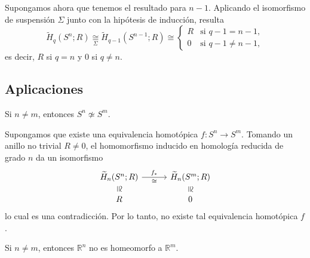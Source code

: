 \begin{dem}
Supongamos ahora que tenemos el resultado para $n - 1$. Aplicando el isomorfismo de suspensión $\Sigma$ junto con la hipótesis de inducción, resulta
\[
\widetilde{H}_q(S^n; R) \underset{\Sigma}{\cong} \widetilde{H}_{q-1}(S^{n-1}; R) \cong
\begin{cases}
R & \text{si } q - 1 = n - 1, \\
0 & \text{si } q - 1 \neq n - 1,
\end{cases}
\]
es decir, $R$ si $q = n$ y $0$ si $q \neq n$.
\end{dem}

\subsection{Aplicaciones}
\begin{corolario}
Si $n \neq m$, entonces $S^n \not\simeq S^m$.
\end{corolario}

\begin{dem}
Supongamos que existe una equivalencia homotópica $f \colon S^n \to S^m$. Tomando un anillo no trivial $R \neq 0$, el homomorfismo inducido en homología reducida de grado $n$ da un isomorfismo
\[
\begin{tikzcd}[column sep=3.0em, row sep=1.0em]
\widetilde{H}_n(S^n; R)
    \arrow[r, "f_*", "\cong"']
    \arrow[d, phantom, "\cong"{description, sloped, inner sep=1pt}]
& \widetilde{H}_n(S^m; R)
    \arrow[d, phantom, "\cong"{description, sloped, inner sep=1pt}] \\
R & 0
\end{tikzcd}
\]
lo cual es una contradicción. Por lo tanto, no existe tal equivalencia homotópica $f$.
\end{dem}

\begin{teorema}
Si $n \neq m$, entonces $\mathbb{R}^n$ no es homeomorfo a $\mathbb{R}^m$.
\end{teorema}


